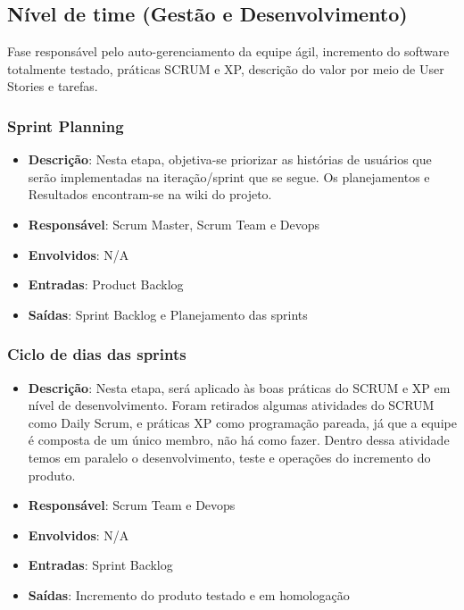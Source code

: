 \subsection{Nível de time (Gestão e Desenvolvimento)}

Fase responsável pelo auto-gerenciamento da equipe ágil, incremento do software totalmente testado, práticas SCRUM e XP, descrição do valor por meio de User Stories e tarefas.

\subsubsection{Sprint Planning}

\begin{itemize}
  \item \textbf{Descrição}: Nesta etapa, objetiva-se priorizar as histórias de usuários que serão implementadas na
    iteração/sprint que se segue. Os planejamentos e Resultados encontram-se na wiki do projeto.
  \item \textbf{Responsável}: Scrum Master, Scrum Team e Devops
  \item \textbf{Envolvidos}: N/A
  \item \textbf{Entradas}: Product Backlog
  \item \textbf{Saídas}: Sprint Backlog e Planejamento das sprints
\end{itemize}

\subsubsection{Ciclo de dias das sprints}

\begin{itemize}
  \item \textbf{Descrição}: Nesta etapa, será aplicado às boas práticas do SCRUM e XP em nível de desenvolvimento. Foram retirados algumas atividades do SCRUM como Daily Scrum, e práticas XP como programação pareada, já que a equipe é composta de um único membro, não há como fazer. Dentro dessa atividade temos em paralelo o desenvolvimento, teste e operações do incremento do produto.
  \item \textbf{Responsável}: Scrum Team e Devops
  \item \textbf{Envolvidos}: N/A
  \item \textbf{Entradas}: Sprint Backlog
  \item \textbf{Saídas}: Incremento do produto testado e em homologação
\end{itemize}

